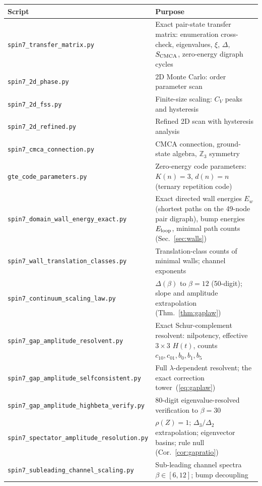 \documentclass[11pt]{article}
\theoremstyle{remark}
\begin{document}
\begin{appendices}
\begin{center}
\footnotesize
\begin{tabular}{@{}p{6.7cm}p{8.2cm}@{}}
\toprule
Script & Purpose \\
\midrule
\texttt{spin7\_transfer\_matrix.py}
  & Exact pair-state transfer matrix: enumeration cross-check, eigenvalues,
    $\xi$, $\Delta$, $S_{\rm CMCA}$, zero-energy digraph cycles \\
\texttt{spin7\_2d\_phase.py}
  & 2D Monte Carlo: order parameter scan \\
\texttt{spin7\_2d\_fss.py}
  & Finite-size scaling: $C_V$ peaks and hysteresis \\
\texttt{spin7\_2d\_refined.py}
  & Refined 2D scan with hysteresis analysis \\
\texttt{spin7\_cmca\_connection.py}
  & CMCA connection, ground-state algebra, $\mathbb{Z}_3$ symmetry \\
\texttt{gte\_code\_parameters.py}
  & Zero-energy code parameters: $K(n) = 3$, $d(n) = n$ (ternary repetition
    code) \\
\midrule
\texttt{spin7\_domain\_wall\_energy\_exact.py}
  & Exact directed wall energies $E_w$ (shortest paths on the 49-node pair
    digraph), bump energies $E_{\rm loop}$, minimal path counts
    (Sec.~\ref{sec:walls}) \\
\texttt{spin7\_wall\_translation\_classes.py}
  & Translation-class counts of minimal walls; channel exponents \\
\texttt{spin7\_continuum\_scaling\_law.py}
  & $\Delta(\beta)$ to $\beta = 12$ (50-digit); slope and amplitude
    extrapolation (Thm.~\ref{thm:gaplaw}) \\
\texttt{spin7\_gap\_amplitude\_resolvent.py}
  & Exact Schur-complement resolvent: nilpotency, effective $3 \times 3$
    $H(t)$, counts $c_{10}, c_{01}, b_0, b_1, b_5$ \\
\texttt{spin7\_gap\_amplitude\_selfconsistent.py}
  & Full $\lambda$-dependent resolvent; the exact correction
    tower~(\ref{eq:gaplaw}) \\
\texttt{spin7\_gap\_amplitude\_highbeta\_verify.py}
  & 80-digit eigenvalue-resolved verification to $\beta = 30$ \\
\texttt{spin7\_spectator\_amplitude\_resolution.py}
  & $\rho(Z) = 1$; $\Delta_3/\Delta_2$ extrapolation; eigenvector basins;
    rule null (Cor.~\ref{cor:gapratio}) \\
\texttt{spin7\_subleading\_channel\_scaling.py}
  & Sub-leading channel spectra $\beta \in [6, 12]$; bump decoupling

\end{tabular}
\end{center}
\end{appendices}
\end{document}
